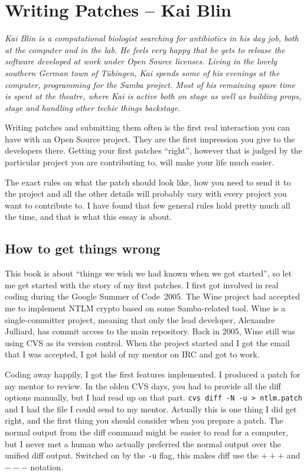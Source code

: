 \chapter{Writing Patches -- Kai Blin}

\textit{Kai Blin is a computational biologist searching for antibiotics in his
    day job, both at the computer and in the lab. He feels very happy that he
    gets to release the software developed at work under Open Source licenses.
    Living in the lovely southern German town of T\"ubingen, Kai spends some of
    his evenings at the computer, programming for the Samba project. Most of
    his remaining spare time is spent at the theatre, where Kai is active both
    on stage as well as building props, stage and handling other techie
    things backstage.}

Writing patches and submitting them often is the first real interaction you can
have with an Open Source project. They are the first impression you give to the
developers there. Getting your first patches ``right'', however that is judged
by the particular project you are contributing to, will make your life much
easier.

The exact rules on what the patch should look like, how you need to send it to
the project and all the other details will probably vary with every project you
want to contribute to. I have found that few general rules hold pretty much all
the time, and that is what this essay is about.

\section*{How to get things wrong}

This book is about ``things we wish we had known when we got started'',
so let me get started with the story of my first patches. I first got involved
in real coding during the Google Summer of Code\texttrademark ~2005. The Wine
project had accepted me to implement NTLM crypto based on some Samba-related
tool. Wine is a single-committer project, meaning that only the lead developer,
Alexandre Julliard, has commit access to the main repository. Back in 2005, Wine
still was using CVS as its version control. When the project started and I got
the email that I was accepted, I got hold of my mentor on IRC and got to work.

Coding away happily, I got the first features implemented. I produced a patch
for my mentor to review. In the olden CVS days, you had to provide all the diff
options manually, but I had read up on that part.
\mbox{\texttt{cvs diff -N -u > ntlm.patch}} and I had the file I could send to
my mentor. Actually this is one thing I did get right, and the first thing you
should consider when you prepare a patch. The normal output from the diff
command might be easier to read for a computer, but I never met a human who
actually preferred the normal output over the unified diff output. Switched on
by the \texttt{-u} flag, this makes diff use the \texttt{$+++$} and
\texttt{$---$} notation.

